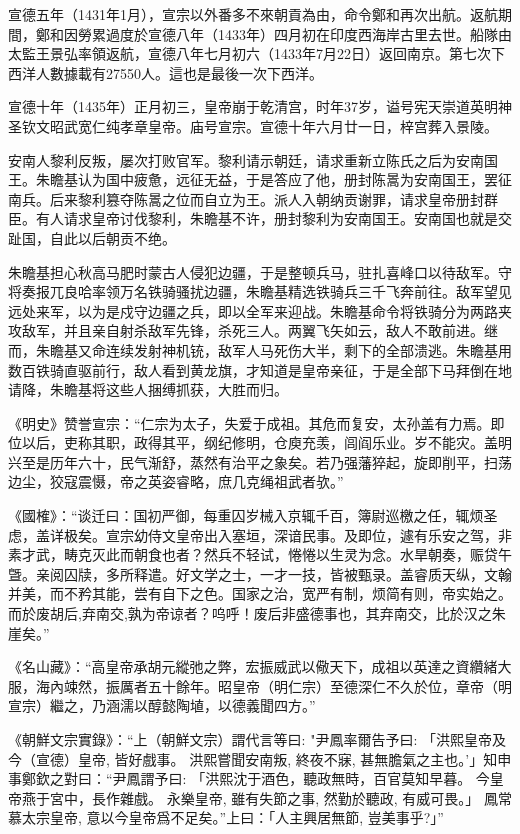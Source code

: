 宣德五年（1431年1月），宣宗以外番多不來朝貢為由，命令鄭和再次出航。返航期間，鄭和因勞累過度於宣德八年（1433年）四月初在印度西海岸古里去世。船隊由太監王景弘率領返航，宣德八年七月初六（1433年7月22日）返回南京。第七次下西洋人數據載有27550人。這也是最後一次下西洋。

宣德十年（1435年）正月初三，皇帝崩于乾清宫，时年37岁，谥号宪天崇道英明神圣钦文昭武宽仁纯孝章皇帝。庙号宣宗。宣德十年六月廿一日，梓宫葬入景陵。

安南人黎利反叛，屡次打败官军。黎利请示朝廷，请求重新立陈氏之后为安南国王。朱瞻基认为国中疲惫，远征无益，于是答应了他，册封陈暠为安南国王，罢征南兵。后来黎利篡夺陈暠之位而自立为王。派人入朝纳贡谢罪，请求皇帝册封群臣。有人请求皇帝讨伐黎利，朱瞻基不许，册封黎利为安南国王。安南国也就是交趾国，自此以后朝贡不绝。

朱瞻基担心秋高马肥时蒙古人侵犯边疆，于是整顿兵马，驻扎喜峰口以待敌军。守将奏报兀良哈率领万名铁骑骚扰边疆，朱瞻基精选铁骑兵三千飞奔前往。敌军望见远处来军，以为是戍守边疆之兵，即以全军来迎战。朱瞻基命令将铁骑分为两路夹攻敌军，并且亲自射杀敌军先锋，杀死三人。两翼飞矢如云，敌人不敢前进。继而，朱瞻基又命连续发射神机铳，敌军人马死伤大半，剩下的全部溃逃。朱瞻基用数百铁骑直驱前行，敌人看到黄龙旗，才知道是皇帝亲征，于是全部下马拜倒在地请降，朱瞻基将这些人捆缚抓获，大胜而归。

《明史》赞誉宣宗：“仁宗为太子，失爱于成祖。其危而复安，太孙盖有力焉。即位以后，吏称其职，政得其平，纲纪修明，仓庾充羡，闾阎乐业。岁不能灾。盖明兴至是历年六十，民气渐舒，蒸然有治平之象矣。若乃强藩猝起，旋即削平，扫荡边尘，狡寇震慑，帝之英姿睿略，庶几克绳祖武者欤。”

《國榷》：“谈迁曰：国初严御，每重囚岁械入京辄千百，簿尉巡檄之任，辄烦圣虑，盖详极矣。宣宗幼侍文皇帝出入塞垣，深谙民事。及即位，遽有乐安之驾，非素才武，畴克灭此而朝食也者？然兵不轻试，惓惓以生灵为念。水旱朝奏，赈贷午曁。亲阅囚牍，多所释遣。好文学之士，一才一技，皆被甄录。盖睿质天纵，文翰并美，而不矜其能，尝有自下之色。国家之治，宽严有制，烦简有则，帝实始之。而於废胡后,弃南交,孰为帝谅者？呜呼！废后非盛德事也，其弃南交，比於汉之朱崖矣。”

《名山藏》：“高皇帝承胡元縱弛之弊，宏振威武以儆天下，成祖以英達之資纘緒大服，海內竦然，振厲者五十餘年。昭皇帝（明仁宗）至德深仁不久於位，章帝（明宣宗）繼之，乃涵濡以醇懿陶埴，以德義聞四方。”

《朝鮮文宗實錄》：“上（朝鮮文宗）謂代言等曰: "尹鳳率爾告予曰: 「洪熙皇帝及今（宣德）皇帝, 皆好戲事。 洪熙嘗聞安南叛, 終夜不寐, 甚無膽氣之主也。’」知申事鄭欽之對曰：“尹鳳謂予曰: 「洪熙沈于酒色，聽政無時，百官莫知早暮。 今皇帝燕于宮中，長作雜戲。 永樂皇帝, 雖有失節之事, 然勤於聽政, 有威可畏。」 鳳常慕太宗皇帝, 意以今皇帝爲不足矣。”上曰：「人主興居無節, 豈美事乎?」”

